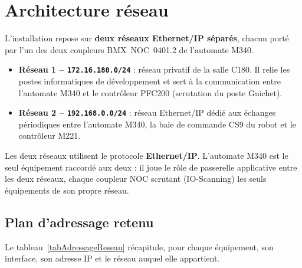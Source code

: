 \section{Architecture réseau}
\label{secReseaux}

L'installation repose sur \textbf{deux réseaux Ethernet/IP séparés}, chacun
porté par l'un des deux coupleurs BMX~NOC~0401.2 de l'automate M340.

\begin{itemize}
    \item \textbf{Réseau 1 -- \texttt{172.16.180.0/24}} : réseau privatif de
    la salle C180. Il relie les postes informatiques de développement et
    sert à la communication entre l'automate M340 et le contrôleur PFC200
    (scrutation du poste Guichet).

    \item \textbf{Réseau 2 -- \texttt{192.168.0.0/24}} : réseau Ethernet/IP
    dédié aux échanges périodiques entre l'automate M340, la baie de
    commande CS9 du robot et le contrôleur M221.
\end{itemize}

Les deux réseaux utilisent le protocole \textbf{Ethernet/IP}. L'automate
M340 est le seul équipement raccordé aux deux : il joue le rôle de
passerelle applicative entre les deux réseaux, chaque coupleur NOC scrutant
(IO-Scanning) les seuls équipements de son propre réseau.

\subsection{Plan d'adressage retenu}

Le tableau~\ref{tabAdressageReseau} récapitule, pour chaque équipement, son
interface, son adresse IP et le réseau auquel elle appartient.

